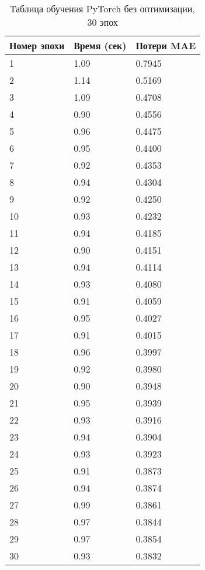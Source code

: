 \documentclass[a4paper,12pt,titlepage,final]{article}
\begin{document}
\begin{table}[H]
\centering
\begin{tabular}{|p{6.4cm}|p{3.2cm}|p{3.2cm}|}
\hline
Номер эпохи & Время (сек) & Потери MAE \\
\hline
1 & 1.09 & 0.7945 \\ [1.5ex]
\hline
2 & 1.14 & 0.5169 \\ [1.5ex]
\hline
3 & 1.09 & 0.4708 \\ [1.5ex]
\hline
4 & 0.90 & 0.4556 \\ [1.5ex]
\hline
5 & 0.96 & 0.4475 \\ [1.5ex]
\hline
6 & 0.95 & 0.4400 \\ [1.5ex]
\hline
7 & 0.92 & 0.4353 \\ [1.5ex]
\hline
8 & 0.94 & 0.4304 \\ [1.5ex]
\hline
9 & 0.92 & 0.4250 \\ [1.5ex]
\hline
10 & 0.93 & 0.4232 \\ [1.5ex]
\hline
11 & 0.94 & 0.4185 \\ [1.5ex]
\hline
12 & 0.90 & 0.4151 \\ [1.5ex]
\hline
13 & 0.94 & 0.4114 \\ [1.5ex]
\hline
14 & 0.93 & 0.4080 \\ [1.5ex]
\hline
15 & 0.91 & 0.4059 \\ [1.5ex]
\hline
16 & 0.95 & 0.4027 \\ [1.5ex]
\hline
17 & 0.91 & 0.4015 \\ [1.5ex]
\hline
18 & 0.96 & 0.3997 \\ [1.5ex]
\hline
19 & 0.92 & 0.3980 \\ [1.5ex]
\hline
20 & 0.90 & 0.3948 \\ [1.5ex]
\hline
21 & 0.95 & 0.3939 \\ [1.5ex]
\hline
22 & 0.93 & 0.3916 \\ [1.5ex]
\hline
23 & 0.94 & 0.3904 \\ [1.5ex]
\hline
24 & 0.93 & 0.3923 \\ [1.5ex]
\hline
25 & 0.91 & 0.3873 \\ [1.5ex]
\hline
26 & 0.94 & 0.3874 \\ [1.5ex]
\hline
27 & 0.99 & 0.3861 \\ [1.5ex]
\hline
28 & 0.97 & 0.3844 \\ [1.5ex]
\hline
29 & 0.97 & 0.3854 \\ [1.5ex]
\hline
30 & 0.93 & 0.3832 \\ [1.5ex]
\hline
\end{tabular}
\caption{Таблица обучения PyTorch без оптимизации, 30 эпох}
\label{gputable9}
\end{table}
\end{document}
